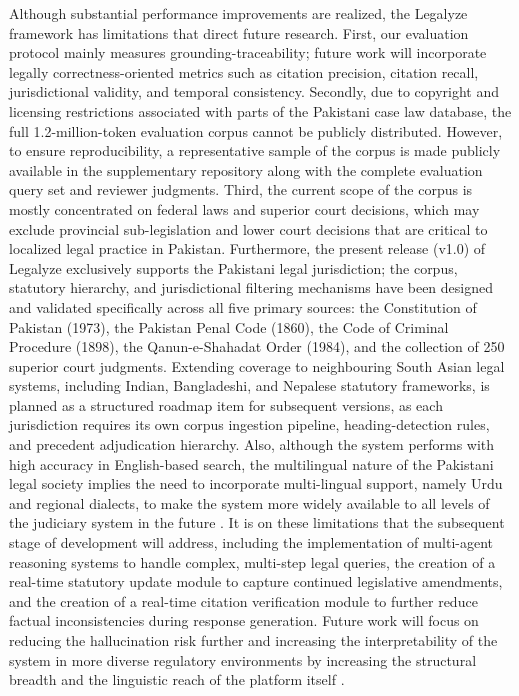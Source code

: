 \hspace*{2em} Although substantial performance improvements are realized, the Legalyze
framework has limitations that direct future research. First, our evaluation protocol mainly measures grounding-traceability; future work will incorporate legally correctness-oriented metrics such as citation precision, citation recall, jurisdictional validity, and temporal consistency. Secondly, due to copyright and licensing restrictions associated with parts of the Pakistani case law database, the full 1.2-million-token evaluation corpus cannot be publicly distributed. However, to ensure reproducibility, a representative sample of the corpus is made publicly available in the supplementary repository along with the complete evaluation query set and reviewer judgments. Third, the current scope of the corpus is mostly concentrated on federal laws and superior court decisions, which may exclude provincial sub-legislation and lower court decisions that are critical to localized legal practice in Pakistan. Furthermore, the present release (v1.0) of Legalyze exclusively supports the Pakistani legal jurisdiction; the corpus, statutory hierarchy, and jurisdictional filtering mechanisms have been designed and validated specifically across all five primary sources: the Constitution of Pakistan (1973), the Pakistan Penal Code (1860), the Code of Criminal Procedure (1898), the Qanun-e-Shahadat Order (1984), and the collection of 250 superior court judgments. Extending coverage to neighbouring South Asian legal systems, including Indian, Bangladeshi, and Nepalese statutory frameworks, is planned as a structured roadmap item for subsequent versions, as each jurisdiction requires its own corpus ingestion pipeline, heading-detection rules, and precedent adjudication hierarchy. Also,
although the system performs with high accuracy in English-based search, the multilingual
nature of the Pakistani legal society implies the need to incorporate multi-lingual
support, namely Urdu and regional dialects, to make the system more widely available
to all levels of the judiciary system in the future \cite{r605}. It is on these
limitations that the subsequent stage of development will address, including
the implementation of multi-agent reasoning systems to handle complex, multi-step legal
queries, the creation of a real-time statutory update module to capture continued
legislative amendments, and the creation of a real-time citation verification module to
further reduce factual inconsistencies during response generation. Future work will
focus on reducing the hallucination risk further and increasing the interpretability of
the system in more diverse regulatory environments by increasing the structural breadth
and the linguistic reach of the platform itself \cite{r604}.

